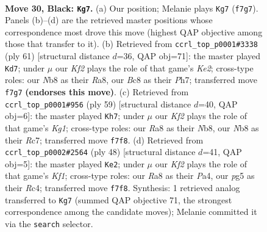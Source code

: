 \documentclass[11pt]{article}
\begin{document}
\clearpage

\begin{figure}[p]\centering
\begin{subfigure}{0.46\textwidth}\centering
\resizebox{\linewidth}{!}{%
\newchessgame
\chessboard[
  setfen={rnb5/p4k2/2p1p3/P1PpN1P1/1P6/2P5/5K2/R1B5 b - - 0 30},
  showmover=false,
  pgfstyle=straightmove, color=movearrow, markmove={f7-g7}
]}
\caption{}
\end{subfigure}\hfill
\begin{subfigure}{0.46\textwidth}\centering
\resizebox{\linewidth}{!}{%
\newchessgame
\chessboard[
  setfen={r7/4k1pp/p1N1np2/1p6/7P/P1R3P1/1P3P2/5K2 b - - 1 31},
  showmover=false,
  pgfstyle=straightmove, color=movearrow, markmove={e7-d7}
]}
\caption{}
\end{subfigure}
\\[4pt]
\begin{subfigure}{0.46\textwidth}\centering
\resizebox{\linewidth}{!}{%
\newchessgame
\chessboard[
  setfen={1n4k1/2r2pp1/3Np1b1/4P2p/5P2/5BP1/7P/R5K1 b - - 1 30},
  showmover=false,
  pgfstyle=straightmove, color=movearrow, markmove={g8-h7}
]}
\caption{}
\end{subfigure}\hfill
\begin{subfigure}{0.46\textwidth}\centering
\resizebox{\linewidth}{!}{%
\newchessgame
\chessboard[
  setfen={r2b2k1/5p2/4p1p1/7p/P1RPpB2/6P1/5P1P/5K2 w - - 4 25},
  showmover=false,
  pgfstyle=straightmove, color=movearrow, markmove={f1-e2}
]}
\caption{}
\end{subfigure}
\caption{\textbf{Move 30, Black: \texttt{Kg7}.} (a) Our position; Melanie plays \texttt{Kg7} (\texttt{f7g7}). Panels (b)--(d) are the retrieved master positions whose correspondence most drove this move (highest QAP objective among those that transfer to it). (b) Retrieved from \texttt{ccrl\_top\_p0001\#3338} (ply 61) [structural distance $d$=36, QAP obj=71]: the master played \texttt{Kd7}; under $\mu$ our \emph{Kf2} plays the role of that game's \emph{Ke2}; cross-type roles: our \emph{N}b8 as their \emph{R}a8, our \emph{B}c8 as their \emph{P}h7; transferred move \texttt{f7g7} \textbf{(endorses this move)}. (c) Retrieved from \texttt{ccrl\_top\_p0001\#956} (ply 59) [structural distance $d$=40, QAP obj=6]: the master played \texttt{Kh7}; under $\mu$ our \emph{Kf2} plays the role of that game's \emph{Kg1}; cross-type roles: our \emph{R}a8 as their \emph{N}b8, our \emph{N}b8 as their \emph{R}c7; transferred move \texttt{f7f8}. (d) Retrieved from \texttt{ccrl\_top\_p0002\#2564} (ply 48) [structural distance $d$=41, QAP obj=5]: the master played \texttt{Ke2}; under $\mu$ our \emph{Kf2} plays the role of that game's \emph{Kf1}; cross-type roles: our \emph{R}a8 as their \emph{P}a4, our \emph{p}g5 as their \emph{R}c4; transferred move \texttt{f7f8}. Synthesis: 1 retrieved analog transferred to \texttt{Kg7} (summed QAP objective 71, the strongest correspondence among the candidate moves); Melanie committed it via the \texttt{search} selector.}
\label{fig:thought-m59}
\end{figure}
\end{document}
